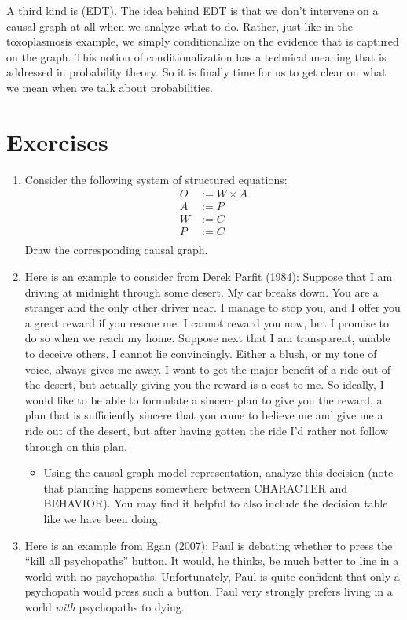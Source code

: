 \documentclass[]{tufte-book}
\providecommand{\tightlist}{%
  \setlength{\itemsep}{0pt}\setlength{\parskip}{0pt}}
\begin{document}
A third kind is  (EDT). The idea behind EDT is that we don't intervene on a causal graph at all when we analyze what to do. Rather, just like in the toxoplasmosis example, we simply conditionalize on the evidence that is captured on the graph. This notion of conditionalization has a technical meaning that is addressed in probability theory. So it is finally time for us to get clear on what we mean when we talk about probabilities.

\hypertarget{exercises-6}{%
\section*{Exercises}\label{exercises-6}}

\begin{enumerate}
\def\labelenumi{\arabic{enumi}.}
\item
  Consider the following system of structured equations: \[\begin{aligned}
  O &:= W \times A\\
  A &:= P \\
  W &:= C \\
  P &:= C \\
  \end{aligned}
  \]
  Draw the corresponding causal graph.
\item
  Here is an example to consider from Derek Parfit (1984): Suppose that I am driving at midnight through some desert. My car breaks down. You are a stranger and the only other driver near. I manage to stop you, and I offer you a great reward if you rescue me. I cannot reward you now, but I promise to do so when we reach my home. Suppose next that I am transparent, unable to deceive others. I cannot lie convincingly. Either a blush, or my tone of voice, always gives me away. I want to get the major benefit of a ride out of the desert, but actually giving you the reward is a cost to me. So ideally, I would like to be able to formulate a sincere plan to give you the reward, a plan that is sufficiently sincere that you come to believe me and give me a ride out of the desert, but after having gotten the ride I'd rather not follow through on this plan.

  \begin{itemize}
  \tightlist
  \item
    Using the causal graph model representation, analyze this decision (note that planning happens somewhere between CHARACTER and BEHAVIOR). You may find it helpful to also include the decision table like we have been doing.
  \end{itemize}
\item
  Here is an example from Egan (2007): Paul is debating whether to press the ``kill all psychopaths'' button. It would, he thinks, be much better to line in a world with no psychopaths. Unfortunately, Paul is quite confident that only a psychopath would press such a button. Paul very strongly prefers living in a world \emph{with} psychopaths to dying.


\end{enumerate}
\end{document}
